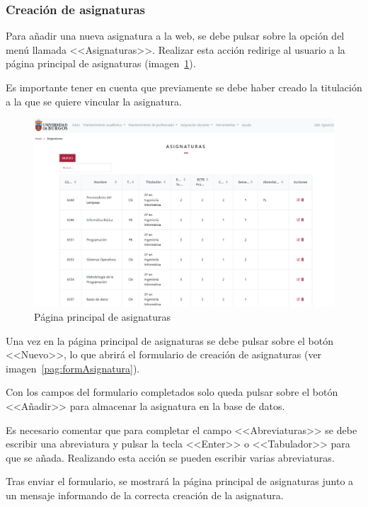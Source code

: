 \subsubsection{Creación de asignaturas}
Para añadir una nueva asignatura a la web, se debe pulsar sobre la opción del menú llamada <<Asignaturas>>.
Realizar esta acción redirige al usuario a la página principal de asignaturas (imagen~\ref{pag:asignaturas}).

Es importante tener en cuenta que previamente se debe haber creado la titulación a la que se quiere vincular la asignatura.

\begin{figure}
	\centering
	\includegraphics[width=\textwidth]{../img/Anexos/Manual usuario/asignaturas.png}
	\caption{Página principal de asignaturas}\label{pag:asignaturas}
\end{figure}

Una vez en la página principal de asignaturas se debe pulsar sobre el botón <<Nuevo>>, lo que abrirá el formulario de creación de asignaturas (ver imagen~\ref{pag:formAsignatura}).

Con los campos del formulario completados solo queda pulsar sobre el botón <<Añadir>> para almacenar la asignatura en la base de datos.

Es necesario comentar que para completar el campo <<Abreviaturas>> se debe escribir una abreviatura y pulsar la tecla <<Enter>> o <<Tabulador>> para que se añada. 
Realizando esta acción se pueden escribir varias abreviaturas.

Tras enviar el formulario, se mostrará la página principal de asignaturas junto a un mensaje informando de la correcta creación de la asignatura.

